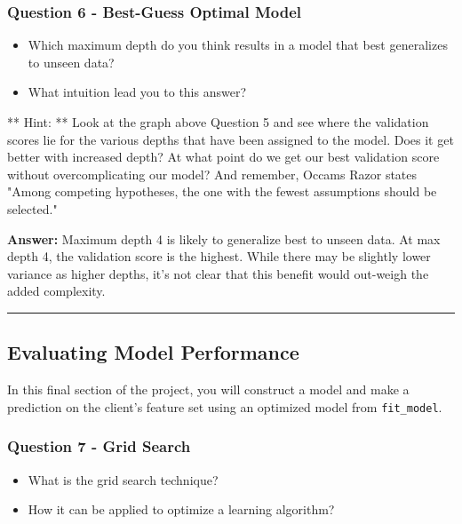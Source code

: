 \documentclass[11pt]{article}
\providecommand{\tightlist}{%
      \setlength{\itemsep}{0pt}\setlength{\parskip}{0pt}}
\begin{document}
    \subsubsection{Question 6 - Best-Guess Optimal
Model}\label{question-6---best-guess-optimal-model}

\begin{itemize}
\tightlist
\item
  Which maximum depth do you think results in a model that best
  generalizes to unseen data?
\item
  What intuition lead you to this answer?
\end{itemize}

** Hint: ** Look at the graph above Question 5 and see where the
validation scores lie for the various depths that have been assigned to
the model. Does it get better with increased depth? At what point do we
get our best validation score without overcomplicating our model? And
remember, Occams Razor states "Among competing hypotheses, the one with
the fewest assumptions should be selected."

    \textbf{Answer: } Maximum depth 4 is likely to generalize best to unseen
data. At max depth 4, the validation score is the highest. While there
may be slightly lower variance as higher depths, it's not clear that
this benefit would out-weigh the added complexity.

    \begin{center}\rule{0.5\linewidth}{\linethickness}\end{center}

\subsection{Evaluating Model
Performance}\label{evaluating-model-performance}

In this final section of the project, you will construct a model and
make a prediction on the client's feature set using an optimized model
from \texttt{fit\_model}.

    \subsubsection{Question 7 - Grid Search}\label{question-7---grid-search}

\begin{itemize}
\tightlist
\item
  What is the grid search technique?
\item
  How it can be applied to optimize a learning algorithm?
\end{itemize}
\end{document}
